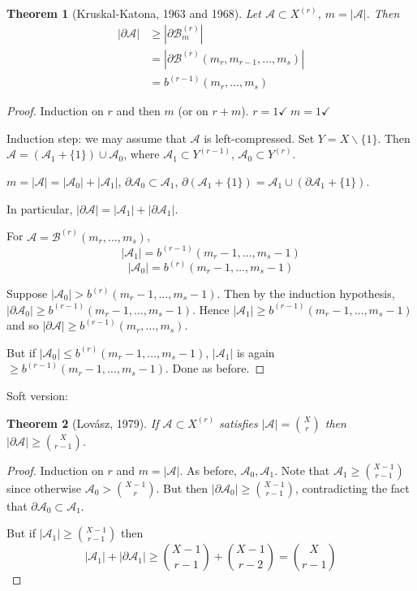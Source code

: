 \documentclass[a4paper]{article}
\newtheorem{theorem}{Theorem}
\newcommand*\abs[1]{\left|#1\right|}
\begin{document}
\begin{theorem}[Kruskal-Katona, 1963 and 1968]
	Let $\mathcal{A} \subset X^{(r)}$, $m = \abs{\mathcal{A}}$. Then
	\begin{align*}
		\abs{\partial\mathcal{A}} &\geq \abs{\partial\mathcal{B}_m^{(r)}} \\
		&= \abs{\partial\mathcal{B}^{(r)}(m_r, m_{r-1}, \dots, m_s)} \\
			&= b^{(r-1)}(m_r, \dots, m_s)
	\end{align*}
\end{theorem}
\begin{proof}
	Induction on $r$ and then $m$ (or on $r+m$). $r=1 \checkmark \ m=1 \checkmark$
	
	Induction step: we may assume that $\mathcal{A}$ is left-compressed.
	Set $Y = X \backslash \{1\}$.
	Then $\mathcal{A} = (\mathcal{A}_1 + \{1\}) \cup \mathcal{A}_0$,
	where $\mathcal{A}_1 \subset Y^{(r-1)}$, $\mathcal{A}_0 \subset Y^{(r)}$.
	
	$m=\abs{\mathcal{A}} = \abs{\mathcal{A}_0} + \abs{\mathcal{A}_1}$, 
	$\partial \mathcal{A}_0 \subset \mathcal{A}_1$,
	$\partial(\mathcal{A}_1 + \{1\}) = \mathcal{A}_1 \cup (\partial\mathcal{A}_1 + \{1\})$.
	
	In particular,
	$\abs{\partial\mathcal{A}} = \abs{\mathcal{A}_1} + \abs{\partial\mathcal{A}_1}$.
	
	For $\mathcal{A} = \mathcal{B}^{(r)}(m_r, \dots, m_s)$, $$\abs{\mathcal{A}_1} = b^{(r-1)}(m_r-1,\dots,m_s-1)$$ $$\abs{\mathcal{A}_0} = b^{(r)}(m_r-1,\dots,m_s-1)$$
	
	Suppose $\abs{\mathcal{A}_0} > b^{(r)}(m_r-1,\dots,m_s-1)$.
	Then by the induction hypothesis,
	$\abs{\partial\mathcal{A}_0} \geq b^{(r-1)}(m_r-1,\dots,m_s-1)$.
	Hence $\abs{\mathcal{A}_1} \geq b^{(r-1)}(m_r-1, \dots, m_s-1)$
	and so $\abs{\partial \mathcal{A}} \geq b^{(r-1)}(m_r, \dots, m_s)$.
	
	But if $\abs{\mathcal{A}_0} \leq b^{(r)}(m_r-1, \dots, m_s-1)$,
	$\abs{\mathcal{A}_1}$ is again $\geq b^{(r-1)}(m_r-1,\dots,m_s-1)$.
	Done as before.
\end{proof}

Soft version:
\begin{theorem}[Lov\'asz, 1979]
	If $\mathcal{A} \subset X^{(r)}$ satisfies $\abs{\mathcal{A}} = {X \choose r}$ then $\abs{\partial\mathcal{A}} \geq {X \choose r-1}$.
\end{theorem}
\begin{proof}
	Induction on $r$ and $m = \abs{\mathcal{A}}$. As before, $\mathcal{A}_0, \mathcal{A}_1$.
	Note that $\mathcal{A}_1 \geq {X-1 \choose r-1}$ since otherwise $\mathcal{A}_0 > {X-1 \choose r}$.
	But then $\abs{\partial\mathcal{A}_0} \geq {X-1 \choose r-1}$,
	contradicting the fact that $\partial\mathcal{A}_0 \subset \mathcal{A}_1$.
	
	But if $\abs{\mathcal{A}_1} \geq {X-1 \choose r-1}$ then $$\abs{\mathcal{A}_1} + \abs{\partial\mathcal{A}_1} \geq {X-1 \choose r-1} + {X-1 \choose r-2} = {X \choose r-1}$$
\end{proof}
\end{document}

